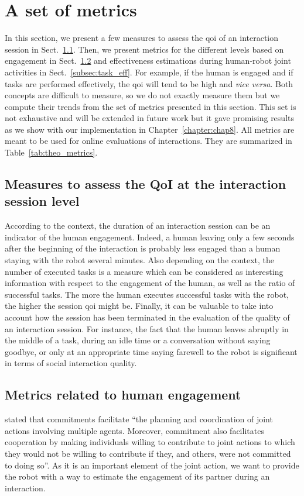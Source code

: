 \documentclass[a4paper,11pt,twoside]{StyleThese}
\begin{document}
\section{A set of metrics}\label{sec:metrics}

In this section, we present a few measures to assess the \acrshort{qoi} of an interaction session in Sect.~\ref{subsec:m_intersess}. Then, we present metrics for the different levels based on engagement in Sect.~\ref{subsec:m_engag} and effectiveness estimations during human-robot joint activities in Sect.~\ref{subsec:task_eff}. For example, if the human is engaged and if tasks are performed effectively, the \acrshort{qoi} will tend to be high and \textit{vice versa}. Both concepts are difficult to measure, so we do not exactly measure them but we compute their trends from the set of metrics presented in this section. This set is not exhaustive and will be extended in future work but it gave promising results as we show with our implementation in Chapter~\ref{chapter:chap8}. All metrics are meant to be used for online evaluations of interactions. They are summarized in Table~\ref{tab:theo_metrics}.


\subsection{Measures to assess the QoI at the interaction session level}\label{subsec:m_intersess}
According to the context, the duration of an interaction session can be an indicator of the human engagement. Indeed, a human leaving only a few seconds after the beginning of the interaction is probably less engaged than a human staying with the robot several minutes. Also depending on the context, the number of executed tasks is a measure which can be considered as interesting information with respect to the engagement of the human, as well as the ratio of successful tasks. The more the human executes successful tasks with the robot, the higher the session \acrshort{qoi} might be. Finally, it can be valuable to take into account how the session has been terminated in the evaluation of the quality of an interaction session. For instance, the fact that the human leaves abruptly in the middle of a task, during an idle time or a conversation without saying goodbye, or only at an appropriate time saying farewell to the robot is significant in terms of social interaction quality.

\subsection{Metrics related to human engagement}\label{subsec:m_engag}
\cite{michael2016} stated that commitments facilitate ``the planning and coordination of joint actions involving multiple agents. Moreover, commitment also facilitates cooperation by making individuals willing to contribute to joint actions to which they would not be willing to contribute if they, and others, were not committed to doing so''. As it is an important element of the joint action, we want to provide the robot with a way to estimate the engagement of its partner during an interaction. 
\end{document}
